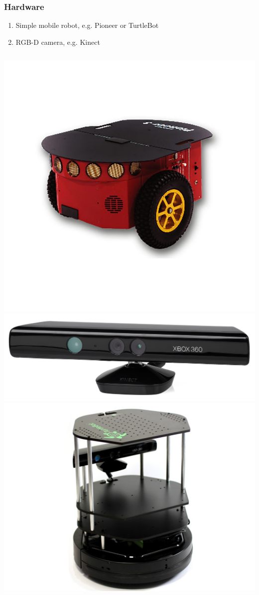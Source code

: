 
\begin{frame}[c] \frametitle{Hardware}

	\begin{enumerate}\itemsep10pt
		\item Simple mobile robot, e.g. Pioneer or TurtleBot
		\item RGB-D camera, e.g. Kinect
	\end{enumerate}

	\begin{columns}[c]
		\flushleft
		\includegraphics[width=0.8\linewidth]{./src/pioneer.jpg}\\
		\flushright
		\includegraphics[width=0.8\linewidth]{./src/kinect.png}
		\includegraphics[width=0.9\linewidth]{./src/turtlebot.jpg}
	\end{columns}

\end{frame}